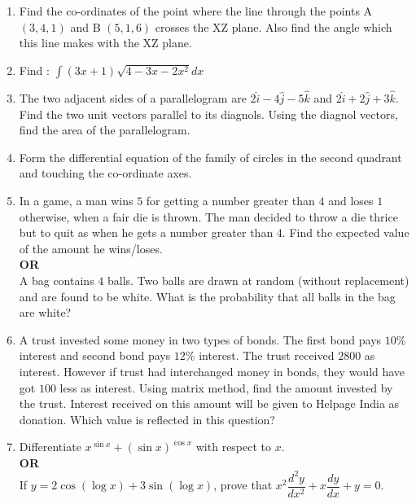 \documentclass[12pt,-letter paper]{article}
\providecommand{\brak}[1]{\ensuremath{\left(#1\right)}}
\begin{document}
\begin{enumerate}
	\item Find the co-ordinates of the point where the line through the points A $\brak{3,4,1} $ and B $\brak{5,1,6}$ crosses the XZ plane. Also find the angle which this line makes with the XZ plane.\\
	
	\item Find : $\int{\brak{3x+1}\sqrt{4 - 3x - 2x^2}dx}$\\
	
	\item The two adjacent sides of a parallelogram  are $2\hat{i} -4\hat{j} -5\hat{k}$ and $2\hat{i} +2\hat{j} +3\hat{k}$. Find the two unit vectors parallel to its diagnols. Using the diagnol vectors, find the area of the parallelogram.\\
	
	\item Form the differential equation of the family of circles in the second quadrant and touching the co-ordinate axes.\\
	
	\item In a game, a man wins \rupee$5$ for getting a number greater than $4$ and loses \rupee$1$ otherwise, when a fair die is thrown. The man decided to throw a die thrice but to quit as when he gets a number greater than $4$. Find the expected value of the amount he wins/loses.\\
	\textbf{OR}\\
	A bag contains $4$ balls. Two balls are drawn at random (without replacement) and are found to be white. What is the probability that all balls in the bag are white?\\
	
	\item A trust invested some money in two types of bonds. The first bond pays $10\%$ interest and second bond pays $12\%$ interest. The trust received \rupee$2800$ as interest. However if trust had interchanged money in bonds, they would have got \rupee$100$ less as interest. Using matrix method, find the amount invested by the trust. Interest received on this amount will be given to Helpage India as donation. Which value is reflected in this question?\\
	
	\item Differentiate $x^{\sin{x}} + \brak{\sin{x}}^{\cos{x}}$ with respect to $x$.\\
	\textbf{OR}\\
	If $y = 2\cos{\brak{\log{x}}} + 3\sin{\brak{\log{x}}}$, prove that $x^2\dfrac{d^2y}{dx^2} + x\dfrac{dy}{dx} + y = 0$.\\
	

\end{enumerate}
\end{document}

